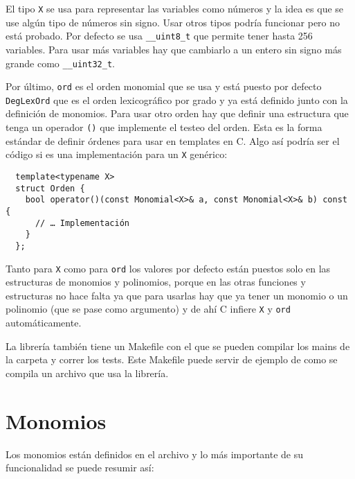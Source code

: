 \documentclass[12pt]{report}
\theoremstyle{customstyle}
\theoremstyle{factstyle}
\newcommand\cpp{C\nolinebreak[4]\hspace{-.05em}\raisebox{.4ex}{\relsize{-3}{\textbf{++}}}\xspace}
\begin{document}
El tipo \texttt{X} se usa para representar las variables como números y la idea es que se use algún tipo de números sin signo. Usar otros tipos podría funcionar pero no está probado. Por defecto se usa \texttt{\_\_uint8\_t} que permite tener hasta 256 variables. Para usar más variables hay que cambiarlo a un entero sin signo más grande como \texttt{\_\_uint32\_t}.

Por último, \texttt{ord} es el orden monomial que se usa y está puesto por defecto \texttt{DegLexOrd} que es el orden lexicográfico por grado y ya está definido junto con la definición de monomios. Para usar otro orden hay que definir una estructura que tenga un operador \texttt{()} que implemente el testeo del orden. Esta es la forma estándar de definir órdenes para usar en templates en \cpp. Algo así podría ser el código si es una implementación para un \texttt{X} genérico:

\begin{verbatim}
  template<typename X>
  struct Orden {
    bool operator()(const Monomial<X>& a, const Monomial<X>& b) const {
      // … Implementación
    }
  };
\end{verbatim}

Tanto para \texttt{X} como para \texttt{ord} los valores por defecto están puestos solo en las estructuras de monomios y polinomios, porque en las otras funciones y estructuras no hace falta ya que para usarlas hay que ya tener un monomio o un polinomio (que se pase como argumento) y de ahí \cpp infiere \texttt{X} y \texttt{ord} automáticamente.

La librería también tiene un Makefile con el que se pueden compilar los mains de la carpeta  y correr los tests. Este Makefile puede servir de ejemplo de como se compila un archivo que usa la librería.

\section{Monomios}

Los monomios están definidos en el archivo  y lo más importante de su funcionalidad se puede resumir así:
\end{document}
